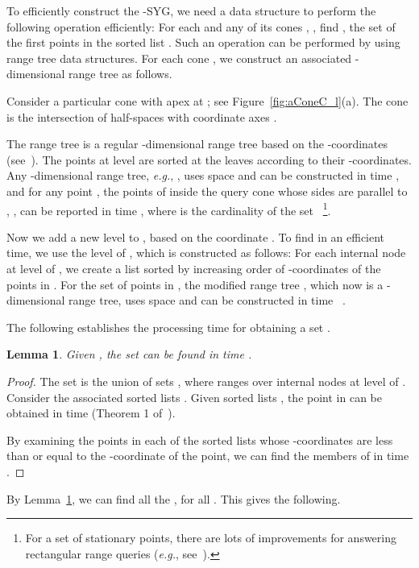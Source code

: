\documentclass[preprint,12pt]{elsarticle}
\def\ksyg{\mbox{-SYG}}
\newcommand{\eg}{\emph{e.g.}}
\newtheorem{lemma}{Lemma}[section]
\begin{document}
To efficiently construct the \ksyg, we need a data structure to perform the following operation efficiently: For each  and any of its cones , , find , the set of the first  points in the sorted list . Such an operation can be performed by using range tree data structures. For each cone , we construct an associated -dimensional range tree  as follows.


Consider a particular cone  with apex at ; see Figure~\ref{fig:aConeC_l}(a). The cone  is the intersection of  half-spaces   with coordinate axes .

The range tree  is a regular -dimensional range tree based on the -coordinates (see~\cite{Berg:2008:CGA:1370949}). The points at level  are sorted at the leaves according to their -coordinates. Any -dimensional range tree, \eg, , uses  space and can be constructed in time , and for any point , the points of  inside the query cone  whose sides are parallel to , , can be reported in time , where  is the cardinality of the set ~\footnote{For a set of stationary points, there are lots of improvements for answering rectangular range queries (\eg, see~\cite{Chan:2011:ORS:1998196.1998198}).}.

Now we add a new level to , based on the coordinate . To find  in an efficient time, we use the level  of , which is constructed as follows: For each internal node  at level  of , we create a list  sorted by increasing order of -coordinates of the points in . For the set  of  points in , the modified range tree , which now is a -dimensional range tree, uses  space and can be constructed in time ~\cite{Berg:2008:CGA:1370949}.
 
The following establishes the processing time for obtaining a set . 

\begin{lemma}\label{the:SortingLists}
Given , the set  can be found in time .
\end{lemma}
\begin{proof}
The set  is the union of  sets , where  ranges over internal nodes  at level  of . Consider the associated sorted lists . Given  sorted lists , the  point in  can be obtained in time  (Theorem 1 of~\cite{Frederickson1982197}). 

By examining the points in each of the  sorted lists whose -coordinates are less than or equal to the -coordinate of the  point, we can find the members of   in time .
\end{proof}


By Lemma~\ref{the:SortingLists}, we can find all the , for all . This gives the following.
\end{document}
